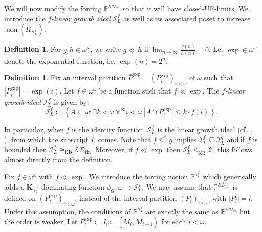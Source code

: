 \documentclass[a4paper,12pt]{amsart}
\theoremstyle{definition}
\newtheorem{dfn}[thm]{Definition}
\numberwithin{thm}{section}
\numberwithin{equation}{section}
\newcommand{\oo}{{\omega}^\omega}
\DeclareMathOperator{\non}{non}
\newcommand{\I}{\mathscr{I}}
\newcommand{\dif}{\mathbb{P}^{\I_L^f}}
\newcommand{\edfin}{\mathcal{ED}_\mathrm{fin}}
\newcommand{\set}[2]
{\left\{{#1}:{#2}\right\}}  %
\newcommand{\card}[1]{\left|#1\right|}   %
\newcommand{\Z}{\mathcal{Z}}
\newcommand{\IL}{\I_{L}}
\newcommand{\posetEDfin}{\mathbb{P}^{\edfin}}
\begin{document}
    We will now modify the forcing $\posetEDfin$ so that it will have closed-UF-limits. We introduce the \emph{$f$-linear growth ideal} $\I^f_L$ as well as its associated poset to increase $\non(K_{\I^f_L})$.
    
    \begin{dfn}
        For $g,h\in\oo$, we write
        $g\ll h$ if $\lim_{n\to\infty}\frac{g(n)}{h(n)}=0$. Let $\exp\in\oo$ denote the exponential function, i.e. $\exp(n)=2^n$. 
    \end{dfn}
    
    \begin{dfn}
    	Fix an interval partition $\bar{P}^\mathrm{exp}=(P_i^\mathrm{exp})_{i<\omega}$ of $\omega$ such that $|P^\mathrm{exp}_i|=\exp(i)$. Let $f\in\oo$ be a function such that $f\ll\exp$.
        The \emph{$f$-linear growth ideal} $\IL^f$ is given by:
    	\begin{equation*}
    		\IL^f\coloneqq\set{A\subseteq\omega}{\exists k<\omega~\forall^\infty i<\omega~\card{A\cap P_i^\mathrm{exp}}\leq k\cdot f(i)}.
    	\end{equation*}
    \end{dfn}

    In particular, when $f$ is the identity function, $\IL^f$ is the linear growth ideal (cf.\ {\cite[Page 56]{Hru11}, \cite[Page 3]{BM14}}), from which the subscript $L$ comes.
    Note that $f\leq^* g$ implies $\IL^f\subseteq\IL^g$ and if $f$ is bounded then $\IL^f\cong_{\mathrm{KB}}\edfin$. Moreover, if $f\ll\exp$ then $\IL^f\leq_{\mathrm{KB}}\Z$; this follows almost directly from the definition.
    
    Fix $f\in\oo$ with $f\ll\exp$. 
    We introduce the forcing notion $\dif$ which generically adds a $\mathbf{K}_{\I_L^f}$-dominating function $\phi_G\colon\omega\to\IL^f$.
    We may assume that $\posetEDfin$ is defined on $(P_i^\mathrm{exp})_{i<\omega}$, instead of the interval partition $(P_i)_{i<\omega}$ with $|P_i|=i$. Under this assumption, the conditions of $\dif$ are exactly the same as $\posetEDfin$ but the order is weaker. Let $P_i^\mathrm{exp}\coloneqq I_i\coloneqq\left[M_i,M_{i+1}\right)$ for each $i<\omega$.
\end{document}
